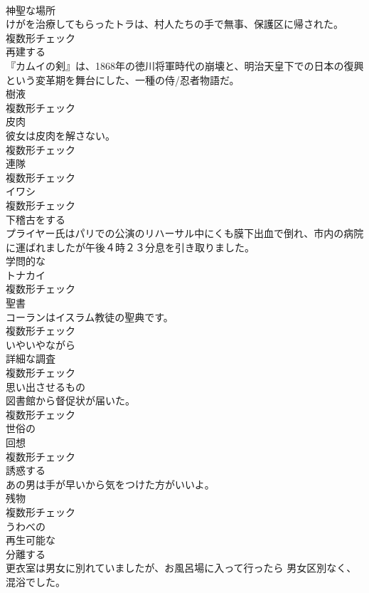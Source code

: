\documentclass[8pt]{extreport}
\begin{document}
\begin{CJK}{UTF8}{min}
\\	[名詞]	神聖な場所	
\\	けがを治療してもらったトラは、村人たちの手で無事、保護区に帰された。	
\\	複数形チェック
\\	[動詞]	再建する	
\\	『カムイの剣』は、1868年の徳川将軍時代の崩壊と、明治天皇下での日本の復興という変革期を舞台にした、一種の侍/忍者物語だ。	
\\	[名詞]	樹液	
\\	複数形チェック
\\	[名詞]	皮肉	
\\	彼女は皮肉を解さない。	
\\	複数形チェック
\\	[名詞]	連隊	
\\	複数形チェック
\\	[名詞]	イワシ	
\\	複数形チェック
\\	[動詞]	下稽古をする	
\\	プライヤー氏はパリでの公演のリハーサル中にくも膜下出血で倒れ、市内の病院に運ばれましたが午後４時２３分息を引き取りました。	
\\	[形容詞]	学問的な	
\\	[名詞]	トナカイ	
\\	複数形チェック
\\	[名詞]	聖書	
\\	コーランはイスラム教徒の聖典です。	
\\	複数形チェック
\\	[副詞]	いやいやながら	
\\	[名詞]	詳細な調査	
\\	複数形チェック
\\	[名詞]	思い出させるもの	
\\	図書館から督促状が届いた。	
\\	複数形チェック
\\	[形容詞]	世俗の	
\\	[名詞]	回想	
\\	複数形チェック
\\	[動詞]	誘惑する	
\\	あの男は手が早いから気をつけた方がいいよ。	
\\	[名詞]	残物	
\\	複数形チェック
\\	[形容詞]	うわべの	
\\	[形容詞]	再生可能な	
\\	[動詞]	分離する	
\\	更衣室は男女に別れていましたが、お風呂場に入って行ったら 男女区別なく、混浴でした。	

\end{CJK}
\end{document}
